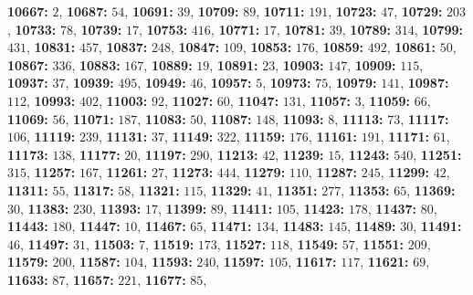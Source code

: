 \textsf{\bfseries 10667:} $2$, \textsf{\bfseries 10687:} $54$, \textsf{\bfseries 10691:} $39$, \textsf{\bfseries 10709:} $89$, \textsf{\bfseries 10711:} $191$, \textsf{\bfseries 10723:} $47$, \textsf{\bfseries 10729:} $203$, \textsf{\bfseries 10733:} $78$, \textsf{\bfseries 10739:} $17$, \textsf{\bfseries 10753:} $416$, \textsf{\bfseries 10771:} $17$, \textsf{\bfseries 10781:} $39$, \textsf{\bfseries 10789:} $314$, \textsf{\bfseries 10799:} $431$, \textsf{\bfseries 10831:} $457$, \textsf{\bfseries 10837:} $248$, \textsf{\bfseries 10847:} $109$, \textsf{\bfseries 10853:} $176$, \textsf{\bfseries 10859:} $492$, \textsf{\bfseries 10861:} $50$, \textsf{\bfseries 10867:} $336$, \textsf{\bfseries 10883:} $167$, \textsf{\bfseries 10889:} $19$, \textsf{\bfseries 10891:} $23$, \textsf{\bfseries 10903:} $147$, \textsf{\bfseries 10909:} $115$, \textsf{\bfseries 10937:} $37$, \textsf{\bfseries 10939:} $495$, \textsf{\bfseries 10949:} $46$, \textsf{\bfseries 10957:} $5$, \textsf{\bfseries 10973:} $75$, \textsf{\bfseries 10979:} $141$, \textsf{\bfseries 10987:} $112$, \textsf{\bfseries 10993:} $402$, \textsf{\bfseries 11003:} $92$, \textsf{\bfseries 11027:} $60$, \textsf{\bfseries 11047:} $131$, \textsf{\bfseries 11057:} $3$, \textsf{\bfseries 11059:} $66$, \textsf{\bfseries 11069:} $56$, \textsf{\bfseries 11071:} $187$, \textsf{\bfseries 11083:} $50$, \textsf{\bfseries 11087:} $148$, \textsf{\bfseries 11093:} $8$, \textsf{\bfseries 11113:} $73$, \textsf{\bfseries 11117:} $106$, \textsf{\bfseries 11119:} $239$, \textsf{\bfseries 11131:} $37$, \textsf{\bfseries 11149:} $322$, \textsf{\bfseries 11159:} $176$, \textsf{\bfseries 11161:} $191$, \textsf{\bfseries 11171:} $61$, \textsf{\bfseries 11173:} $138$, \textsf{\bfseries 11177:} $20$, \textsf{\bfseries 11197:} $290$, \textsf{\bfseries 11213:} $42$, \textsf{\bfseries 11239:} $15$, \textsf{\bfseries 11243:} $540$, \textsf{\bfseries 11251:} $315$, \textsf{\bfseries 11257:} $167$, \textsf{\bfseries 11261:} $27$, \textsf{\bfseries 11273:} $444$, \textsf{\bfseries 11279:} $110$, \textsf{\bfseries 11287:} $245$, \textsf{\bfseries 11299:} $42$, \textsf{\bfseries 11311:} $55$, \textsf{\bfseries 11317:} $58$, \textsf{\bfseries 11321:} $115$, \textsf{\bfseries 11329:} $41$, \textsf{\bfseries 11351:} $277$, \textsf{\bfseries 11353:} $65$, \textsf{\bfseries 11369:} $30$, \textsf{\bfseries 11383:} $230$, \textsf{\bfseries 11393:} $17$, \textsf{\bfseries 11399:} $89$, \textsf{\bfseries 11411:} $105$, \textsf{\bfseries 11423:} $178$, \textsf{\bfseries 11437:} $80$, \textsf{\bfseries 11443:} $180$, \textsf{\bfseries 11447:} $10$, \textsf{\bfseries 11467:} $65$, \textsf{\bfseries 11471:} $134$, \textsf{\bfseries 11483:} $145$, \textsf{\bfseries 11489:} $30$, \textsf{\bfseries 11491:} $46$, \textsf{\bfseries 11497:} $31$, \textsf{\bfseries 11503:} $7$, \textsf{\bfseries 11519:} $173$, \textsf{\bfseries 11527:} $118$, \textsf{\bfseries 11549:} $57$, \textsf{\bfseries 11551:} $209$, \textsf{\bfseries 11579:} $200$, \textsf{\bfseries 11587:} $104$, \textsf{\bfseries 11593:} $240$, \textsf{\bfseries 11597:} $105$, \textsf{\bfseries 11617:} $117$, \textsf{\bfseries 11621:} $69$, \textsf{\bfseries 11633:} $87$, \textsf{\bfseries 11657:} $221$, \textsf{\bfseries 11677:} $85$, 

